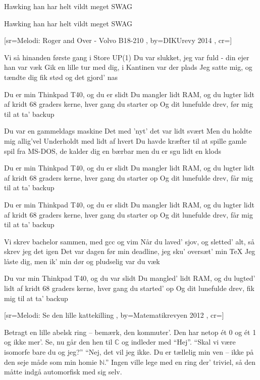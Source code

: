 \documentclass[pdftex,12pt]{article}
\begin{document}
\begin{songs}{}
\endverse
\beginverse
Hawking han har helt vildt meget SWAG

\endverse
\beginverse
Hawking han har helt vildt meget SWAG

\endverse
\endsong



[sr={Melodi: Roger and Over - Volvo B18-210}
,
by={DIKUrevy 2014}
,
cr={}]\hypertarget{Thinkpad T40}{}
\label{song16}

\beginverse
Vi så hinanden første gang
i Store UP(1)
Du var slukket, jeg var fuld -
din ejer han var væk
Gik en lille tur med dig,
i Kantinen var der plads
Jeg satte mig, og tændte dig
fik stød og det gjord' nas

\endverse
\beginverse
Du er min Thinkpad T40, og du er slidt
Du mangler lidt RAM, og du lugter lidt af kridt
68 graders kerne, hver gang du starter op
Og dit lunefulde drev, før mig til at ta' backup

\endverse
\beginverse
Du var en gammeldags maskine
Det med 'nyt' det var lidt svært
Men du holdte mig allig'vel
Underholdt med lidt af hvert
Du havde kræfter til at spille
gamle spil fra MS-DOS,
de kalder dig en bærbar
men du er sgu lidt en klods

\endverse
\beginverse
Du er min Thinkpad T40, og du er slidt
Du mangler lidt RAM, og du lugter lidt af kridt
68 graders kerne, hver gang du starter op
Og dit lunefulde drev, får mig til at ta' backup

\endverse
\beginverse
Du er min Thinkpad T40, og du er slidt
Du mangler lidt RAM, og du lugter lidt af kridt
68 graders kerne, hver gang du starter op
Og dit lunefulde drev, får mig til at ta' backup

\endverse
\beginverse
Vi skrev bachelor sammen,
med gcc og vim
Når du laved' sjov, og sletted' alt,
så skrev jeg det igen
Det var dagen før min deadline,
jeg sku' oversæt' min TeX
Jeg låste dig, men ik' min dør
og pludselig var du væk

\endverse
\beginverse
Du var min Thinkpad T40, og du var slidt
Du mangled' lidt RAM, og du lugted' lidt af kridt
68 graders kerne, hver gang du started' op
Og dit lunefulde drev, fik mig til at ta' backup

\endverse
\endsong



﻿[sr={Melodi: Se den lille kattekilling}
,
by={Matematikrevyen 2012}
,
cr={}]\hypertarget{En ringe historie}{}
\label{song17}

\beginverse
Betragt en lille abelsk ring -- bemærk, den kommuter'.
Den har netop ét 0 og ét 1 og ikke mer'.
Se, nu går den hen til $\mathbb C$ og indleder med ``Hej''.
``Skal vi være isomorfe bare du og jeg?''
``Nej, det vil jeg ikke. Du er tællelig min ven
-- ikke på den seje måde som min homie $\mathbb N$.''
Ingen ville lege med en ring der' triviel,
så den måtte indgå automorfisk med sig selv.
\endverse
\endsong




\end{songs}
\end{document}

